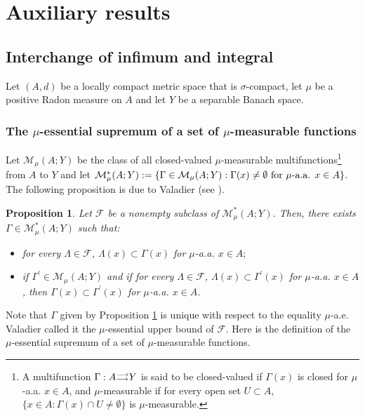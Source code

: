 \documentclass[10pt]{amsart}
\numberwithin{equation}{section}
\newtheorem{proposition}[theorem]{Proposition}
\theoremstyle{definition}
\theoremstyle{remark}
\begin{document}
\section{Auxiliary results}

\subsection{Interchange of infimum and integral}

Let $(A,d)$ be a locally compact metric space that is $\sigma$-compact, let $\mu$ be a positive Radon measure on $A$ and let $Y$ be a separable Banach space.

\subsubsection{The $\mu$-essential supremum of a set of $\mu$-measurable functions} Let $\mathcal{M}_\mu(A;Y)$ be the class of all closed-valued $\mu$-measurable multifunctions\footnote{A multifunction $\Gamma:A{{\scriptstyle\buildrel{\scriptstyle\longrightarrow}
\over{{}_{\scriptstyle\longrightarrow}}}} Y$ is said to be closed-valued if $\Gamma(x)$ is closed for $\mu$-a.a. $x\in A$, and $\mu$-measurable if for every open set $U\subset A$, $\{x\in A:\Gamma(x)\cap U\not=\emptyset\}$ is $\mu$-measurable.} from $A$ to $Y$ and let $\mathcal{M}^*_\mu(A;Y):=\{\Gamma\in\mathcal{M}_\mu(A;Y):\Gamma(x)\not=\emptyset\hbox{ for $\mu$-a.a. }x\in A\}$. The following proposition is due to Valadier (see \cite[Proposition 14]{valadier71}).

\begin{proposition}\label{Valadier-prop}
Let $\mathcal{F}$ be a nonempty subclass of $\mathcal{M}^*_\mu(A;Y)$. Then, there exists $\Gamma\in\mathcal{M}^*_\mu(A;Y)$ such that{\rm:}
\begin{itemize}
\item[{\rm(i)}] for every $\Lambda\in\mathcal{F}$, $\Lambda(x)\subset\Gamma(x)$ for $\mu$-a.a. $x\in A;$ 
\item[{\rm(ii)}] if $\Gamma^\prime\in\mathcal{M}_\mu(A;Y)$ and if for every $\Lambda\in\mathcal{F}$, $\Lambda(x)\subset\Gamma^\prime(x)$ for $\mu$-a.a. $x\in A$, then $\Gamma(x)\subset\Gamma^\prime(x)$ for $\mu$-a.a. $x\in A$.
\end{itemize}
\end{proposition}
Note that $\Gamma$ given by Proposition \ref{Valadier-prop} is unique with respect to the equality $\mu$-a.e. Valadier called it the $\mu$-essential upper bound of $\mathcal{F}$. Here is the definition of the $\mu$-essential supremum of a set of $\mu$-measurable functions.
\end{document}
